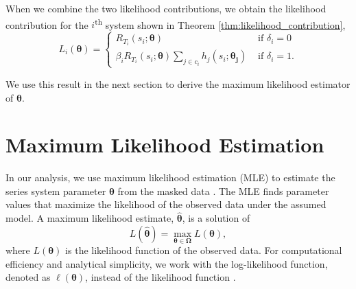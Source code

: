 \documentclass[
]{article}
\begin{document}
When we combine the two likelihood contributions, we obtain the
likelihood contribution for the \(i\)\textsuperscript{th} system shown
in Theorem \ref{thm:likelihood_contribution}, \[
L_i(\boldsymbol{\theta}) =
\begin{cases}
    R_{T_i}(s_i;\boldsymbol{\theta})                      &\text{ if } \delta_i = 0\\
    \beta_i R_{T_i}(s_i;\boldsymbol{\theta})
        \sum_{j\in c_i} h_j(s_i;\boldsymbol{\theta_j})   &\text{ if } \delta_i = 1.
\end{cases}
\]

We use this result in the next section to derive the maximum likelihood
estimator of \(\boldsymbol{\theta}\).

\hypertarget{sec:mle}{%
\section{Maximum Likelihood Estimation}\label{sec:mle}}

In our analysis, we use maximum likelihood estimation (MLE) to estimate
the series system parameter \(\boldsymbol{\theta}\) from the masked data
\citep{bain, casella2002statistical}. The MLE finds parameter values
that maximize the likelihood of the observed data under the assumed
model. A maximum likelihood estimate, \(\hat{\boldsymbol{\theta}}\), is
a solution of \begin{equation}
\label{eq:mle}
L(\hat{\boldsymbol{\theta}}) = \max_{\boldsymbol{\theta }\in \boldsymbol{\Omega}} L(\boldsymbol{\theta}),
\end{equation} where \(L(\boldsymbol{\theta})\) is the likelihood
function of the observed data. For computational efficiency and
analytical simplicity, we work with the log-likelihood function, denoted
as \(\ell(\boldsymbol{\theta})\), instead of the likelihood function
\citep{casella2002statistical}.
\end{document}
